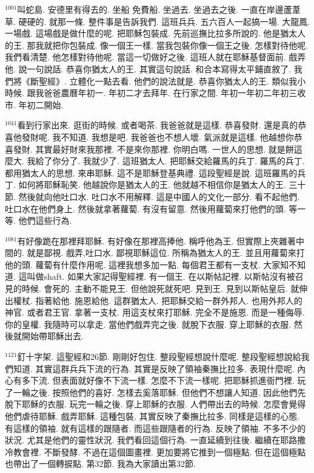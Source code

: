 \documentclass{book}
\begin{document}
$^{1001}$叫蛇島.
安德里有得去的.
坐船 免費船.
坐過去.
坐過去之後.
一直在岸邊蘆葦草.
硬硬的.
就那一條.
整件事是告訴我們.
這班兵兵.
五六百人一起搞一場.
大龍鳳.
一場戲.
這場戲是做什麼的呢.
把耶穌包裝成.
先前巡撫比拉多所說的.
他是猶太人的王.
那我就把你包裝成.
像一個王一樣.
當我包裝你像一個王之後.
怎樣對待他呢.
我們看清楚.
他怎樣對待他呢.
當這一切做好之後.
這班人就在耶穌基督面前.
戲弄他.
說一句說話.
恭喜你猶太人的王.
其實這句說話.
和合本寫得太平鋪直敘了.
我們將《斷聖經》.
立體化一點去看.
他們的說法就是.
恭喜你猶太人的王.
類似我小時候.
跟我爸爸農曆年初一.
年初二才去拜年.
在行家之間.
年初一年初二年初三收市.
年初二開始.

$^{1041}$看到行家出來.
逛街的時候.
或者喝茶.
我爸爸就是這樣.
恭喜發財.
還是真的恭喜他發財呢.
我不知道.
我想是吧.
我爸爸也不想人壞.
氣派就是這樣.
他越想你恭喜發財.
其實最好財來我那裡.
不是來你那裡.
你明白嗎.
一世人的思想.
就是餅這麼大.
我給了你分了.
我就少了.
這班猶太人.
把耶穌交給羅馬的兵丁.
羅馬的兵丁.
都用猶太人的思想.
來串耶穌.
這不是耶穌登基典禮.
這段聖經是說.
這班羅馬的兵丁.
如何將耶穌恥笑.
他越說你是猶太人的王.
他就越不相信你是猶太人的王.
三十節.
然後就向他吐口水.
吐口水不用解釋.
這是中國人的文化一部分.
看不起他們.
吐口水在他們身上.
然後就拿著蘿蔔.
有沒有留意.
然後用蘿蔔來打他們的頭.
等一等.
他們這些行為.

$^{1081}$有好像跪在那裡拜耶穌.
有好像在那裡高捧他.
稱呼他為王.
但實際上夾雜著中間的.
就是鄙視.
戲弄,吐口水.
鄙視耶穌這位.
所稱為猶太人的王.
並且用蘿蔔來打他的頭.
蘿蔔有什麼作用呢.
這裡我想多加一點.
每個君王都有一支杖.
大家知不知道.
這叫做shaft.
如果大家記得聖經裡.
有一個王.
在以斯帖記裡.
以斯帖沒有被召見的時候.
會死的.
主動不能見王.
但他說死就死吧.
見到王.
見到以斯帖皇后.
就伸出權杖.
指著給他.
施恩給他.
這群猶太人.
把耶穌交給一群外邦人.
也用外邦人的神官.
或者君王官.
拿著一支杖.
用這支杖來打耶穌.
完全不是施恩.
而是一種侮辱.
你的皇權.
我隨時可以拿走.
當他們戲弄完之後.
就脫下衣服.
穿上耶穌的衣服.
然後就開始帶耶穌出去.

$^{1121}$釘十字架.
這聖經和26節.
剛剛好包住.
整段聖經想說什麼呢.
整段聖經想說給我們知道.
其實這群兵兵下流的行為.
其實是反映了領袖秦撫比拉多.
表現什麼呢.
內心有多下流.
但表面就好像不下流一樣.
怎麼不下流一樣呢.
把耶穌抓進衙門裡.
玩了一輪之後.
按照他們的喜好.
怎樣去奚落耶穌.
但他們不想讓人知道.
因此他們先脫下耶穌的衣服.
玩完一輪之後.
穿上耶穌的衣服.
人們帶出去的時候.
怎麼會覺得他們虐待耶穌.
戲弄耶穌.
這種包裝.
其實反映了秦撫比拉多.
同樣是這樣的心態.
有這樣的領袖.
就有這樣的跟隨者.
而這些跟隨者的行為.
反映了領袖.
不多不少的狀況.
尤其是他們的靈性狀況.
我們看回這個行為.
一直延續到往後.
繼續在耶路撒冷教會裡.
不斷發酵.
不過在這個圖畫裡.
更加要將它推到一個極點.
但在這個極點也帶出了一個轉捩點.
第32節.
我為大家讀出第32節.
\end{document}
